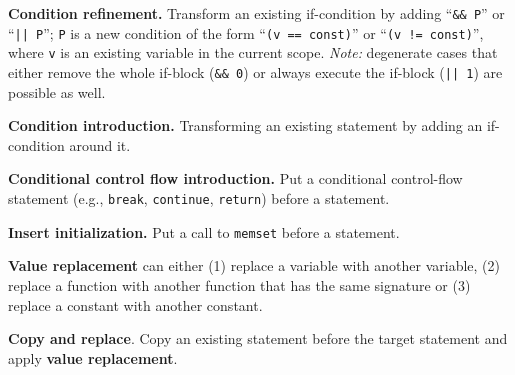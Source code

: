 \textbf{Condition refinement.} Transform an existing if-condition by adding ``\texttt{\&\& P}'' or ``\texttt{|| P}''; \texttt{P} is a new condition of the form ``\texttt{(v == const)}'' or ``\texttt{(v != const)}'', where \texttt{v} is an existing variable in the current scope.
\emph{Note:} degenerate cases that either remove the whole if-block (\texttt{\&\& 0}) or always execute the if-block (\texttt{|| 1}) are possible as well.

\textbf{Condition introduction.} Transforming an existing statement by adding an if-condition around it.

\textbf{Conditional control flow introduction.} Put a conditional control-flow statement (e.g., \texttt{break}, \texttt{continue}, \texttt{return}) before a statement.

\textbf{Insert initialization.} Put a call to \texttt{memset} before a statement.

\textbf{Value replacement} can either (1) replace a variable with another variable, (2) replace a function with another function that has the same signature or (3) replace a constant with another constant.

\textbf{Copy and replace}. Copy an existing statement before the target statement and apply \textbf{value replacement}.

